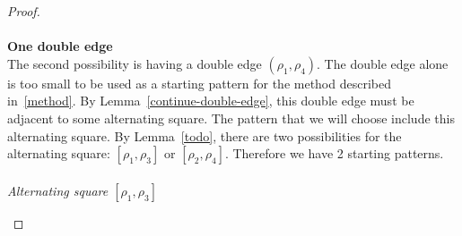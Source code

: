 \begin{proof}
\paragraph{}
\textbf{One double edge}\\
The second possibility is having a double edge $(\rho_1, \rho_4)$. The double edge alone is too small to be used as a starting pattern for the method described in~\ref{method}. By Lemma~\ref{continue-double-edge}, this double edge must be adjacent to some alternating square. The pattern that we will choose include this alternating square. By Lemma~\ref{todo}, there are two possibilities for the alternating square: $[\rho_1, \rho_3]$ or $[\rho_2, \rho_4]$. Therefore we have 2 starting patterns.

\paragraph{}
\textit{Alternating square $[\rho_1, \rho_3]$}

\begin{figure}[H]
  \begin{center}
    \caption{}
  \end{center}
\end{figure}


\end{proof}
